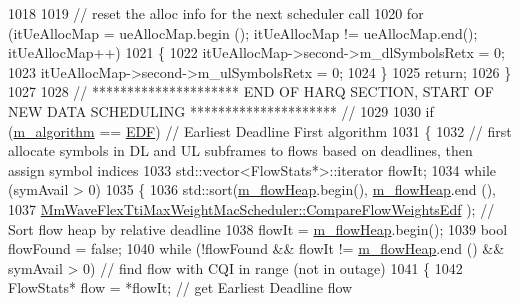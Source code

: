 \begin{DoxyCode}
1018 
1019                 \textcolor{comment}{// reset the alloc info for the next scheduler call}
1020                 \textcolor{keywordflow}{for} (itUeAllocMap = ueAllocMap.begin (); itUeAllocMap != ueAllocMap.end(); itUeAllocMap++)
1021                 \{
1022                         itUeAllocMap->second->m\_dlSymbolsRetx = 0;
1023                         itUeAllocMap->second->m\_ulSymbolsRetx = 0;
1024                 \}
1025                 \textcolor{keywordflow}{return};
1026         \}
1027 
1028         \textcolor{comment}{// ********************* END OF HARQ SECTION, START OF NEW DATA SCHEDULING ********************* //}
1029 
1030         \textcolor{keywordflow}{if} (\hyperlink{classns3_1_1MmWaveFlexTtiMaxWeightMacScheduler_a334a408b37c8c7cb50203d357021ea21}{m\_algorithm} == \hyperlink{classns3_1_1MmWaveFlexTtiMaxWeightMacScheduler_a1c15c536cd0b5b7c19533c208c7817a0ab4a151aa9f7d0ff09d04a82f2d403df7}{EDF})           \textcolor{comment}{// Earliest Deadline First algorithm}
1031         \{
1032                 \textcolor{comment}{// first allocate symbols in DL and UL subframes to flows based on deadlines, then assign
       symbol indices}
1033                 std::vector<FlowStats*>::iterator flowIt;
1034                 \textcolor{keywordflow}{while} (symAvail > 0)
1035                 \{
1036                         std::sort(\hyperlink{classns3_1_1MmWaveFlexTtiMaxWeightMacScheduler_a5914fa5ecbe0fef6968a27a04df53e7b}{m\_flowHeap}.begin(), \hyperlink{classns3_1_1MmWaveFlexTtiMaxWeightMacScheduler_a5914fa5ecbe0fef6968a27a04df53e7b}{m\_flowHeap}.end (),
1037                                                                 
      \hyperlink{classns3_1_1MmWaveFlexTtiMaxWeightMacScheduler_a68278967ed08dca5c7850e9b879d3c66}{MmWaveFlexTtiMaxWeightMacScheduler::CompareFlowWeightsEdf}
      );               \textcolor{comment}{// Sort flow heap by relative deadline}
1038                         flowIt = \hyperlink{classns3_1_1MmWaveFlexTtiMaxWeightMacScheduler_a5914fa5ecbe0fef6968a27a04df53e7b}{m\_flowHeap}.begin();
1039                         \textcolor{keywordtype}{bool} flowFound = \textcolor{keyword}{false};
1040                         \textcolor{keywordflow}{while} (!flowFound && flowIt != \hyperlink{classns3_1_1MmWaveFlexTtiMaxWeightMacScheduler_a5914fa5ecbe0fef6968a27a04df53e7b}{m\_flowHeap}.end () && symAvail > 0)             \textcolor{comment}{
      // find flow with CQI in range (not in outage)}
1041                         \{
1042                                 FlowStats* flow = *flowIt;              \textcolor{comment}{// get Earliest Deadline flow}

\end{DoxyCode}
